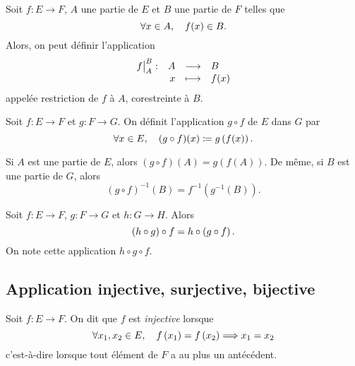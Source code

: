 \documentclass{magnoliaold}
\begin{document}
\begin{remarqueUnique}
\remarque Soit $f:E\to F$, $A$ une partie de $E$ et $B$ une partie de $F$
  telles que
  \[\forall x\in A,\quad f(x)\in B.\]
  Alors, on peut définir l'application
  \[\dspappli{\restricorestri{f}{A}{B}}{A}{B}{x}{f(x)}\]
  appelée restriction de $f$ à $A$, corestreinte à $B$.
\end{remarqueUnique}



\begin{definition}[utile=-3]
Soit $f:E\to F$ et $g:F\to G$. On définit l'application $g\circ f$ de $E$ dans $G$ par
\[\forall x\in E,\quad (g\circ f)(x)\coloneqq g\left(f(x)\right).\]
\end{definition}

\begin{remarqueUnique}
\remarque Si $A$ est une partie de $E$, alors $(g\circ f)(A)=g(f(A))$. De même, si
  $B$ est une partie de $G$, alors \[(g\circ f)^{-1}(B)=f^{-1}(g^{-1}(B)).\]
\end{remarqueUnique}


\begin{proposition}[utile=-3]
Soit $f:E\to F$, $g:F\to G$ et $h:G\to H$. Alors
\[\left(h\circ g\right)\circ f=h\circ\left(g\circ f\right).\]
On note cette application $h\circ g\circ f$.
\end{proposition}

\subsection{Application injective, surjective, bijective}

\begin{definition}[utile=-3]
Soit $f:E\to F$. On dit que $f$ est \emph{injective} lorsque
\[\forall x_1,x_2\in E ,\quad f\left(x_1\right)=f\left(x_2\right) \Longrightarrow x_1=x_2\]
c'est-à-dire lorsque tout élément de $F$ a au plus un antécédent.
\end{definition}
\end{document}
